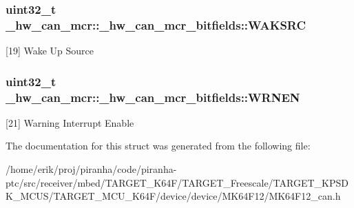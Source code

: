\subsubsection[{\texorpdfstring{W\+A\+K\+S\+RC}{WAKSRC}}]{\setlength{\rightskip}{0pt plus 5cm}uint32\+\_\+t \+\_\+hw\+\_\+can\+\_\+mcr\+::\+\_\+hw\+\_\+can\+\_\+mcr\+\_\+bitfields\+::\+W\+A\+K\+S\+RC}\hypertarget{struct__hw__can__mcr_1_1__hw__can__mcr__bitfields_a4e1607c011c2017a9eda845e6ae6dcfb}{}\label{struct__hw__can__mcr_1_1__hw__can__mcr__bitfields_a4e1607c011c2017a9eda845e6ae6dcfb}
\mbox{[}19\mbox{]} Wake Up Source 
\subsubsection[{\texorpdfstring{W\+R\+N\+EN}{WRNEN}}]{\setlength{\rightskip}{0pt plus 5cm}uint32\+\_\+t \+\_\+hw\+\_\+can\+\_\+mcr\+::\+\_\+hw\+\_\+can\+\_\+mcr\+\_\+bitfields\+::\+W\+R\+N\+EN}\hypertarget{struct__hw__can__mcr_1_1__hw__can__mcr__bitfields_af4c1e7146ee0d2b265ab8390d4e433b9}{}\label{struct__hw__can__mcr_1_1__hw__can__mcr__bitfields_af4c1e7146ee0d2b265ab8390d4e433b9}
\mbox{[}21\mbox{]} Warning Interrupt Enable 

The documentation for this struct was generated from the following file\+:\begin{DoxyCompactItemize}
\item 
/home/erik/proj/piranha/code/piranha-\/ptc/src/receiver/mbed/\+T\+A\+R\+G\+E\+T\+\_\+\+K64\+F/\+T\+A\+R\+G\+E\+T\+\_\+\+Freescale/\+T\+A\+R\+G\+E\+T\+\_\+\+K\+P\+S\+D\+K\+\_\+\+M\+C\+U\+S/\+T\+A\+R\+G\+E\+T\+\_\+\+M\+C\+U\+\_\+\+K64\+F/device/device/\+M\+K64\+F12/M\+K64\+F12\+\_\+can.\+h\end{DoxyCompactItemize}
